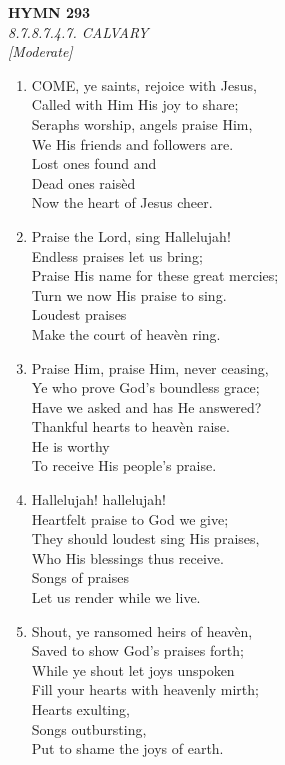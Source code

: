 \newpage
\begin{center}
    {\Large \textbf{HYMN 293}}
    \\
    \textit{8.7.8.7.4.7. CALVARY}
    \\
    \textit{\small [Moderate]}
\end{center}
\vspace{1em}

\begin{enumerate}
    \item COME, ye saints, rejoice with Jesus, \\
        Called with Him His joy to share; \\
        Seraphs worship, angels praise Him, \\
        We His friends and followers are. \\
        Lost ones found and \\
        Dead ones rais\`ed \\
        Now the heart of Jesus cheer.

    \item Praise the Lord, sing Hallelujah! \\
        Endless praises let us bring; \\
        Praise His name for these great mercies; \\
        Turn we now His praise to sing. \\
        Loudest praises \\
        Make the court of heav\`en ring.

    \item Praise Him, praise Him, never ceasing, \\
        Ye who prove God's boundless grace; \\
        Have we asked and has He answered? \\
        Thankful hearts to heav\`en raise. \\
        He is worthy \\
        To receive His people's praise.

    \item Hallelujah! hallelujah! \\
        Heartfelt praise to God we give; \\
        They should loudest sing His praises, \\
        Who His blessings thus receive. \\
        Songs of praises \\
        Let us render while we live.

    \item Shout, ye ransomed heirs of heav\`en, \\
        Saved to show God's praises forth; \\
        While ye shout let joys unspoken \\
        Fill your hearts with heavenly mirth; \\
        Hearts exulting, \\
        Songs outbursting, \\
        Put to shame the joys of earth.

\end{enumerate}

